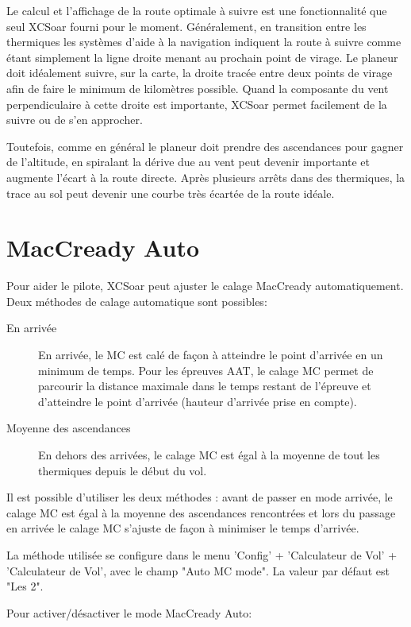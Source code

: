 Le calcul et l'affichage de la route optimale à suivre est une fonctionnalité que seul XCSoar fourni pour le moment. Généralement, en transition entre les thermiques les systèmes d'aide à la navigation indiquent la route à suivre comme étant simplement la ligne droite menant au prochain point de virage. Le planeur doit idéalement suivre, sur la carte, la droite tracée entre deux points de virage afin de faire le minimum de kilomètres possible. Quand la composante du vent perpendiculaire à cette droite est importante, XCSoar permet facilement de la suivre ou de s'en approcher. 

Toutefois, comme en général le planeur doit prendre des ascendances pour gagner de l'altitude, en spiralant la dérive due au vent peut devenir importante et augmente l'écart à la route directe. Après plusieurs arrêts dans des thermiques, la trace au sol peut devenir une courbe très écartée de la route idéale.

\section{MacCready Auto}\label{sec:auto-maccready}

Pour aider le pilote, XCSoar peut ajuster le calage MacCready automatiquement. Deux méthodes de calage automatique sont possibles:
\begin{description}
\item[En arrivée]  En arrivée, le MC est calé de façon à atteindre le point d'arrivée en un minimum de temps. Pour les épreuves AAT, le calage MC permet de parcourir la distance maximale dans le temps restant de l'épreuve et d'atteindre le point d'arrivée (hauteur d'arrivée prise en compte).
\item[Moyenne des ascendances] En dehors des arrivées, le calage MC est égal à la moyenne de tout les thermiques depuis le début du vol.
\end{description}
Il est possible d'utiliser les deux méthodes : avant de passer en mode arrivée, le calage MC est égal à la moyenne des ascendances rencontrées et lors du passage en arrivée le calage MC s'ajuste de façon à minimiser le temps d'arrivée.

La méthode utilisée se configure dans le menu 'Config' + 'Calculateur de Vol' + 'Calculateur de Vol', avec le champ "Auto MC mode". La valeur par défaut est "Les 2".

Pour activer/désactiver le mode MacCready Auto: 
\begin{quote}
\blink{}
\end{quote}

